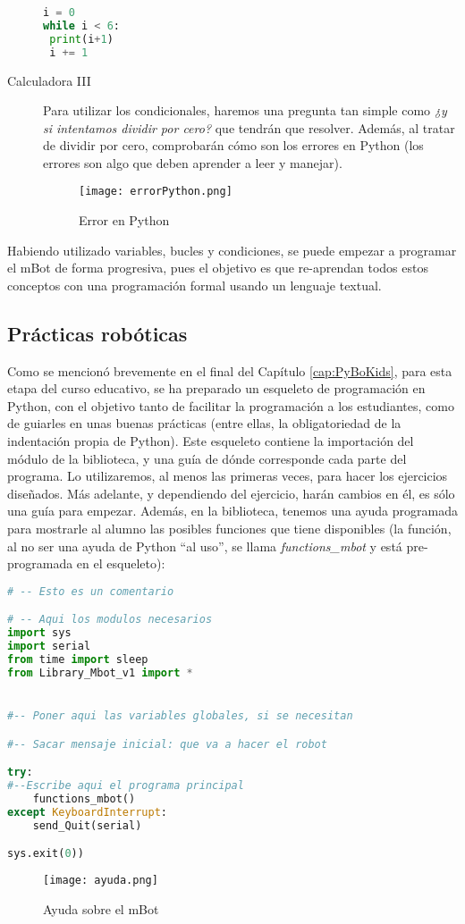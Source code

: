 \begin{description}
\begin{lstlisting}[language=python]
i = 0
while i < 6:
 print(i+1)
 i += 1
\end{lstlisting}
\item [Calculadora III] Para utilizar los condicionales, haremos una pregunta tan simple como \textit{¿y si intentamos dividir por cero?} que tendrán que resolver. Además, al tratar de dividir por cero, comprobarán cómo son los errores en Python (los errores son algo que deben aprender a leer y manejar).
\begin{figure}[H]
	\texttt{[image: errorPython.png]}
	\centering
	\label{img:error}
	\caption{Error en Python}
\end{figure}
\end{description}

Habiendo utilizado variables, bucles y condiciones, se puede empezar a programar el mBot de forma progresiva, pues el objetivo es que re-aprendan todos estos conceptos con una programación formal usando un lenguaje textual.
\subsection{Prácticas robóticas}
Como se mencionó brevemente en el final del Capítulo \ref{cap:PyBoKids}, para esta etapa del curso educativo, se ha preparado un esqueleto de programación en Python, con el objetivo tanto de facilitar la programación a los estudiantes, como de guiarles en unas buenas prácticas (entre ellas, la obligatoriedad de la indentación propia de Python). Este esqueleto contiene la importación del módulo de la biblioteca, y una guía de dónde corresponde cada parte del programa. Lo utilizaremos, al menos las primeras veces, para hacer los ejercicios diseñados. Más adelante, y dependiendo del ejercicio, harán cambios en él, es sólo una guía para empezar. Además, en la biblioteca, tenemos una ayuda programada para mostrarle al alumno las posibles funciones que tiene disponibles (la función, al no ser una ayuda de Python ``al uso'', se llama \textit{functions\_mbot} y está pre-programada en el esqueleto):

\begin{lstlisting}[language=python,caption={Esqueleto proporcionado a modo de ejemplo}]
# -- Esto es un comentario

# -- Aqui los modulos necesarios
import sys
import serial
from time import sleep
from Library_Mbot_v1 import *


#-- Poner aqui las variables globales, si se necesitan

#-- Sacar mensaje inicial: que va a hacer el robot

try:
#--Escribe aqui el programa principal
	functions_mbot()
except KeyboardInterrupt:
	send_Quit(serial)

sys.exit(0))
\end{lstlisting}
\begin{figure}[H]
	\texttt{[image: ayuda.png]}
	\centering
	\label{img:ayuda}
	\caption{Ayuda sobre el mBot}
\end{figure}

